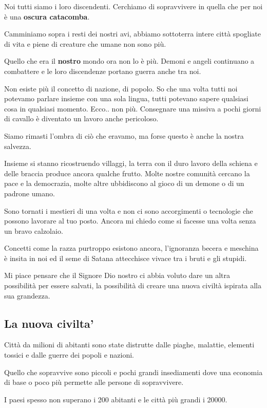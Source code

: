 \documentclass[12pt,a4paper,twoside,openany]{book}
\begin{document}
\begin{multicols}{2}
Noi tutti siamo i loro discendenti. Cerchiamo di sopravvivere in quella che per noi è una \textbf{oscura catacomba}.

Camminiamo sopra i resti dei nostri avi, abbiamo sottoterra intere città spogliate di vita e piene di creature che umane non sono più.

Quello che era il \textbf{nostro} mondo ora non lo è più. Demoni e angeli continuano a combattere e le loro discendenze portano guerra anche tra noi.

Non esiste più il concetto di nazione, di popolo. So che una volta tutti noi potevamo parlare insieme con una sola lingua, tutti potevano sapere qualsiasi cosa in qualsiasi momento.
Ecco.. non più. Consegnare una missiva a pochi giorni di cavallo è diventato un lavoro anche pericoloso.

Siamo rimasti l'ombra di ciò che eravamo, ma forse questo è anche la nostra salvezza. 

Insieme si stanno ricostruendo villaggi, la terra con il duro lavoro della schiena e delle braccia produce ancora qualche frutto.
Molte nostre comunità cercano la pace e la democrazia, molte altre ubbidiscono al gioco di un demone o di un padrone umano.

Sono tornati i mestieri di una volta e non ci sono accorgimenti o tecnologie che possono lavorare al tuo posto. Ancora mi chiedo come si facesse una volta senza un bravo calzolaio. 

Concetti come la razza purtroppo esistono ancora, l'ignoranza becera e meschina è insita in noi ed il seme di Satana attecchisce vivace tra i bruti e gli stupidi.

Mi piace pensare che il Signore Dio nostro ci abbia voluto dare un altra possibilità per essere salvati, la possibilità di creare una nuova civiltà ispirata alla sua grandezza.

\subsection{La nuova civilta'}

Città da milioni di abitanti sono state distrutte dalle piaghe, malattie, elementi tossici e dalle guerre dei popoli e nazioni.

Quello che sopravvive sono piccoli e pochi grandi insediamenti dove una economia di base o poco più permette alle persone di sopravvivere.

I paesi spesso non superano i 200 abitanti e le città più grandi i 20000.


\end{multicols}
\end{document}
